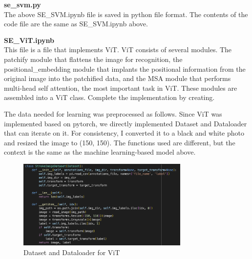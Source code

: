 \textbf{se\_svm.py} \\
The above SE\_SVM.ipynb file is saved in python file format. The contents of the code file are the same as SE\_SVM.ipynb above.


\textbf{SE\_ViT.ipynb} \\
This file is a file that implements ViT. ViT consists of several modules. The patchify module that flattens the image for recognition, the positional\_embedding module that implants the positional information from the original image into the patchified data, and the MSA module that performs multi-head self attention, the most important task in ViT. These modules are assembled into a ViT class. Complete the implementation by creating.

The data needed for learning was preprocessed as follows. Since ViT was implemented based on pytorch, we directly implemented Dataset and Dataloader that can iterate on it. For consistency, I converted it to a black and white photo and resized the image to (150, 150). The functions used are different, but the context is the same as the machine learning-based model above.

\begin{figure}[h]
    \centering
    \includegraphics[width=8.5cm]{images/ViT_dataset.png}
    \caption{Dataset and Dataloader for ViT}
    \label{fig:enter-label}
\end{figure}

